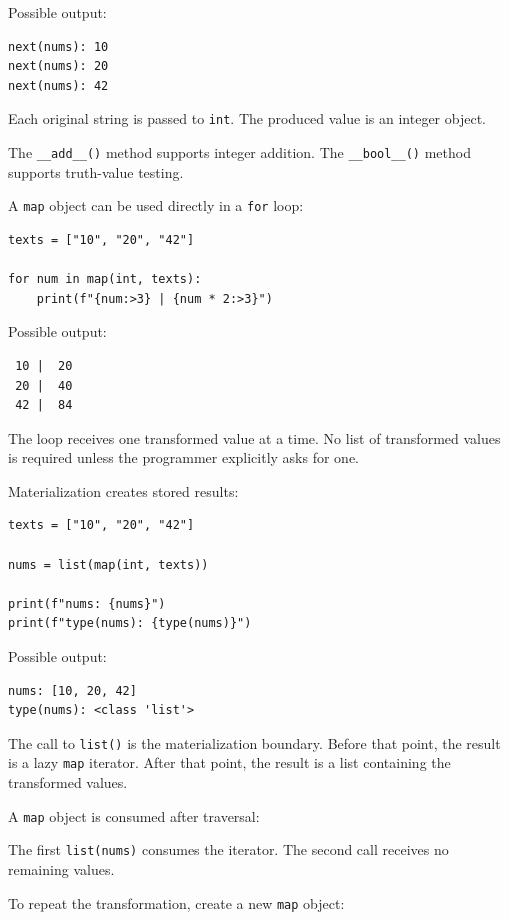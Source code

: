 Possible output:

\begin{verbatim}
next(nums): 10
next(nums): 20
next(nums): 42
\end{verbatim}

Each original string is passed to \texttt{int}. The produced value is an integer object.

The \texttt{\_\_add\_\_()} method supports integer addition. The \texttt{\_\_bool\_\_()} method supports truth-value testing.

A \texttt{map} object can be used directly in a \texttt{for} loop:

\begin{verbatim}
texts = ["10", "20", "42"]

for num in map(int, texts):
    print(f"{num:>3} | {num * 2:>3}")
\end{verbatim}

Possible output:

\begin{verbatim}
 10 |  20
 20 |  40
 42 |  84
\end{verbatim}

The loop receives one transformed value at a time. No list of transformed values is required unless the programmer explicitly asks for one.

Materialization creates stored results:

\begin{verbatim}
texts = ["10", "20", "42"]

nums = list(map(int, texts))

print(f"nums: {nums}")
print(f"type(nums): {type(nums)}")
\end{verbatim}

Possible output:

\begin{verbatim}
nums: [10, 20, 42]
type(nums): <class 'list'>
\end{verbatim}

The call to \texttt{list()} is the materialization boundary. Before that point, the result is a lazy \texttt{map} iterator. After that point, the result is a list containing the transformed values.

A \texttt{map} object is consumed after traversal:

The first \texttt{list(nums)} consumes the iterator. The second call receives no remaining values.

To repeat the transformation, create a new \texttt{map} object:

